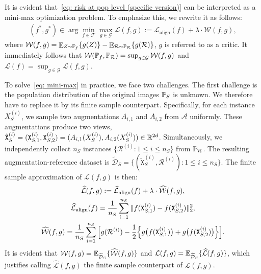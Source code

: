 It is evident that~\eqref{eq: risk at pop level (specific version)} can be interpreted as a mini-max optimization problem. To emphasize this, we rewrite it as follows:
\begin{align}\label{eq: mini-max}
    (f^*, g^*) \in \arg\min_{f \in \mathcal{F}}\max_{g \in \mathcal{G}}\mathcal{L}(f,g) :=\mathcal{L}_{\mathrm{align}}(f) + \lambda \cdot \mathcal{W}(f, g),
\end{align}
where $\mathcal{W}(f, g) = \mathop{\E}_{Z \sim \P_f}\{g(Z)\} - \mathop{\E}_{\mathcal{R} \sim \P_\mathcal{R}}\{g(\mathcal{R})\}$, $g$ is referred to as a critic. It immediately follows that $\mathcal{W}(\P_f, \P_\mathcal{R}) = \sup_{g \in \mathcal{G}}\mathcal{W}(f, g)$ and $\mathcal{L}(f) = \sup_{g \in \mathcal{G}}\mathcal{L}(f, g)$.

To solve~\eqref{eq: mini-max} in practice, we face two challenges. The first challenge is the population distribution of the original images $\P_S$ is unknown. We therefore have to replace it by its finite sample counterpart. Specifically, for each instance $X_S^{(i)}$, we sample two augmentations $A_{i,1}$ and $A_{i,2}$ from $\mathcal{A}$ uniformly. These augmentations produce two views, $\tilde{\mathtt{X}}_S^{(i)} = (\mathtt{X}^{(i)}_{S,1}, \mathtt{X}^{(i)}_{S,2}) = (A_{i,1}(X_S^{(i)}), A_{i,2}(X_S^{(i)})) \in \R^{2d}$. Simultaneously, we independently collect $n_S$ instances $\{\mathcal{R}^{(i)}: 1\leq i \leq n_S\}$ from $\P_\mathcal{R}$. The resulting augmentation-reference dataset is $\widetilde{\mathcal{D}}_S = \{(\tilde{\mathtt{X}}_S^{(i)}, \mathcal{R}^{(i)}): 1 \leq i \leq n_S\}$. The finite sample approximation of $\mathcal{L}(f,g)$ is then:
\begin{gather}\label{eq: hatW(f,g)}
    \widehat{\mathcal{L}}(f, g) := \widehat{\mathcal{L}}_{\mathrm{align}}(f) + \lambda \cdot \widehat{\mathcal{W}}(f, g), \nonumber\\
    \widehat{\mathcal{L}}_{\mathrm{align}}(f)=\frac{1}{n_S}\sum_{i=1}^{n_S}\norm{f(\mathtt{X}^{(i)}_{S,1}) - f(\mathtt{X}^{(i)}_{S,2})}_2^2, \nonumber \\
    \widehat{\mathcal{W}}(f, g) = \frac{1}{n_S}\sum_{i=1}^{n_S}\Big[g(\mathcal{R}^{(i)}) - \frac{1}{2}\Big\{g\big(f(\mathtt{X}^{(i)}_{S,1})\big) + g\big(f(\mathtt{X}^{(i)}_{S,2})\big)\Big\}\Big].
\end{gather}
It is evident that $\mathcal{W}(f, g) = \E_{\widetilde{\mathcal{D}}_S}\{\widehat{\mathcal{W}}(f, g)\}$ and $\mathcal{L}(f, g) = \E_{\widetilde{\mathcal{D}}_S}\{\widehat{\mathcal{L}}(f, g)\}$, which justifies calling $\widehat{\mathcal{L}}(f,g)$ the finite sample counterpart of $\mathcal{L}(f,g)$.

